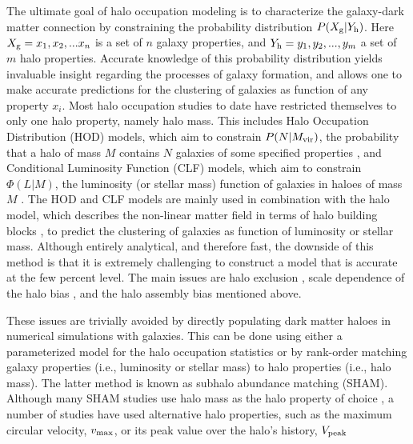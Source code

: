 \documentclass[usenatbib,usegraphicx,letterpaper]{mn2e}
\newcommand{\mvir}{M_{\rm vir}}
\newcommand{\vmax}{v_{\rm max}}
\begin{document}
The ultimate goal of halo occupation modeling is to characterize the
galaxy-dark matter connection by constraining the probability
distribution $P(X_{\rm g}|Y_{\rm h})$. Here $X_{\rm g} = {x_1, x_2,
  ...x_n}$ is a set of $n$ galaxy properties, and $Y_{\rm h} = {y_1,
  y_2,...,y_m}$ a set of $m$ halo properties. Accurate knowledge of
this probability distribution yields invaluable insight regarding the
processes of galaxy formation, and allows one to make accurate
predictions for the clustering of galaxies as function of any property
$x_i$. Most halo occupation studies to date have restricted themselves
to only one halo property, namely halo mass.  This includes Halo
Occupation Distribution (HOD) models, which aim to constrain
$P(N|\mvir)$, the probability that a halo of mass $M$ contains $N$
galaxies of some specified properties
\citep[e.g.,][]{kauffmann_etal97,jing98,benson01,berlind02}, and
Conditional Luminosity Function (CLF) models, which aim to constrain
$\Phi(L|M)$, the luminosity (or stellar mass) function of galaxies in
haloes of mass $M$ \citep[e.g.,][]{yang03,vdBosch03a,cooray06}. The
HOD and CLF models are mainly used in combination with the halo model,
which describes the non-linear matter field in terms of halo building
blocks \citep[e.g.,][]{seljak00,cooray02}, to predict the clustering
of galaxies as function of luminosity or stellar mass.  Although
entirely analytical, and therefore fast, the downside of this method
is that it is extremely challenging to construct a model that is
accurate at the few percent level. The main issues are halo exclusion
\citep[see][]{smith_etal07,vdBosch13}, scale dependence of the halo
bias \citep[see][]{tinker05}, and the halo assembly bias mentioned
above.

These issues are trivially avoided by directly populating dark matter
haloes in numerical simulations with galaxies. This can be done using
either a parameterized model for the halo occupation statistics
\citep[e.g.,][]{Yang_etal04,moster10;behroozi10,behroozi13} or by
rank-order matching galaxy properties (i.e., luminosity or stellar
mass) to halo properties (i.e., halo mass). The latter method is known
as subhalo abundance matching (SHAM).  Although many SHAM studies use
halo mass as the halo property of choice
\citep[e.g.,][]{vale_ostriker04,vale_ostriker06,conroy07,conroy_wechsler09},
a number of studies have used alternative halo properties, such as the
maximum circular velocity, $\vmax$, or its peak value over the halo's
history, $V_{\rm peak}$
\citep[e.g.][]{tasitsiomi_etal04,conroy06,marin_etal08,reddick_etal13}
\end{document}
